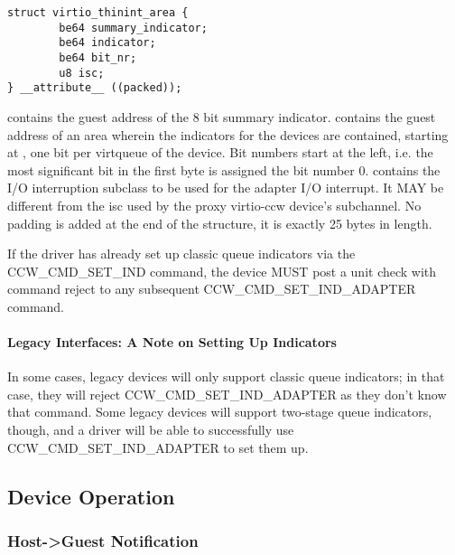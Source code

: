\begin{lstlisting}
struct virtio_thinint_area {
        be64 summary_indicator;
        be64 indicator;
        be64 bit_nr;
        u8 isc;
} __attribute__ ((packed));
\end{lstlisting}

 contains the guest address of the 8 bit summary
indicator.
 contains the guest address of an area wherein the indicators
for the devices are contained, starting at , one bit per
virtqueue of the device. Bit numbers start at the left, i.e. the most
significant bit in the first byte is assigned the bit number 0.
 contains the I/O interruption subclass to be used for the adapter
I/O interrupt. It MAY be different from the isc used by the proxy
virtio-ccw device's subchannel.
No padding is added at the end of the structure, it is exactly 25 bytes
in length.


If the driver has already set up classic queue indicators via the
CCW_CMD_SET_IND command, the device MUST post a unit check with
command reject to any subsequent CCW_CMD_SET_IND_ADAPTER command.

\paragraph{Legacy Interfaces: A Note on Setting Up Indicators}\label{sec:Virtio Transport Options / Virtio over channel I/O / Device Initialization / Setting Up Indicators / Legacy Interfaces: A Note on Setting Up Indicators}

In some cases, legacy devices will only support classic queue indicators;
in that case, they will reject CCW_CMD_SET_IND_ADAPTER as they don't know that
command. Some legacy devices will support two-stage queue indicators, though,
and a driver will be able to successfully use CCW_CMD_SET_IND_ADAPTER to set
them up.

\subsection{Device Operation}\label{sec:Virtio Transport Options / Virtio over channel I/O / Device Operation}

\subsubsection{Host->Guest Notification}\label{sec:Virtio Transport Options / Virtio over channel I/O / Device Operation / Host->Guest Notification}

